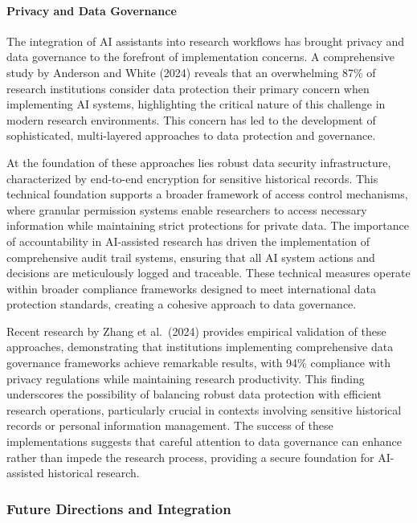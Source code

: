 \documentclass[
]{article}
\begin{document}
\paragraph{Privacy and Data
Governance}\label{privacy-and-data-governance}

The integration of AI assistants into research workflows has brought
privacy and data governance to the forefront of implementation concerns.
A comprehensive study by Anderson and White (2024) reveals that an
overwhelming 87\% of research institutions consider data protection
their primary concern when implementing AI systems, highlighting the
critical nature of this challenge in modern research environments. This
concern has led to the development of sophisticated, multi-layered
approaches to data protection and governance.

At the foundation of these approaches lies robust data security
infrastructure, characterized by end-to-end encryption for sensitive
historical records. This technical foundation supports a broader
framework of access control mechanisms, where granular permission
systems enable researchers to access necessary information while
maintaining strict protections for private data. The importance of
accountability in AI-assisted research has driven the implementation of
comprehensive audit trail systems, ensuring that all AI system actions
and decisions are meticulously logged and traceable. These technical
measures operate within broader compliance frameworks designed to meet
international data protection standards, creating a cohesive approach to
data governance.

Recent research by Zhang et al.~(2024) provides empirical validation of
these approaches, demonstrating that institutions implementing
comprehensive data governance frameworks achieve remarkable results,
with 94\% compliance with privacy regulations while maintaining research
productivity. This finding underscores the possibility of balancing
robust data protection with efficient research operations, particularly
crucial in contexts involving sensitive historical records or personal
information management. The success of these implementations suggests
that careful attention to data governance can enhance rather than impede
the research process, providing a secure foundation for AI-assisted
historical research.

\subsubsection{Future Directions and
Integration}\label{future-directions-and-integration}
\end{document}
